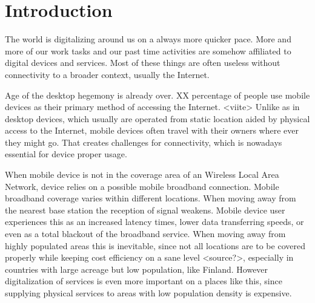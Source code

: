 \chapter{Introduction}



The world is digitalizing around us on a always more quicker pace. More and more of our work tasks and our past time activities are somehow affiliated to digital devices and services. Most of these things are often useless without connectivity to a broader context, usually the Internet. 

Age of the desktop hegemony is already over. XX percentage of people use mobile devices as their primary method of accessing the Internet. <viite> Unlike as in desktop devices, which usually are operated from static location aided by physical access to the Internet, mobile devices often travel with their owners where ever they might go. That creates challenges for connectivity, which is nowadays essential for device proper usage. 

When mobile device is not in the coverage area of an Wireless Local Area Network, device relies on a possible mobile broadband connection. Mobile broadband coverage varies within different locations. When moving away from the nearest base station the reception of signal weakens. Mobile device user experiences this as an increased latency times, lower data transferring speeds, or even as a total blackout of the broadband service. When moving away from highly populated areas this is inevitable, since not all locations are to be covered properly while keeping cost efficiency on a sane level <source?>, especially in countries with large acreage but low population, like Finland. However digitalization of services is even more important on a places like this, since supplying physical services to areas with low population density is expensive. 

